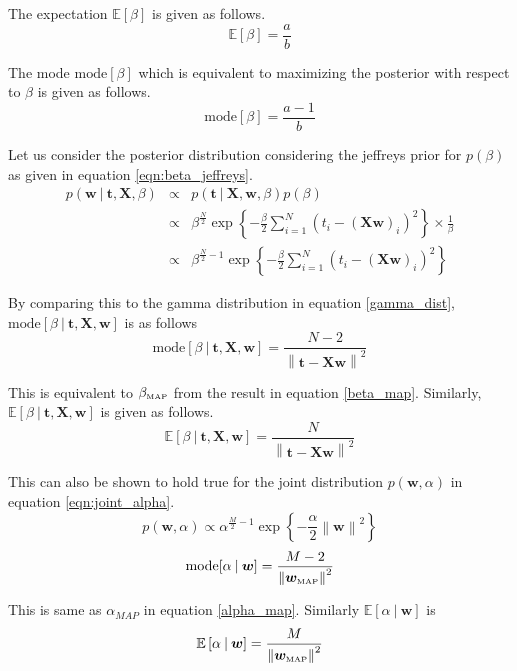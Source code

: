 \documentclass[11pt]{article}
\newcommand{\mean}[1]{\mathbb{E}\left[#1\right]}
\newcommand{\map}[1]{{#1}_{\text{\tiny MAP}}}
\newcommand\given[1][]{\:#1\vert\:}
\newcommand{\norm}[1]{\left\lVert#1\right\rVert}
\begin{document}
The expectation $\mean{\beta}$ is given as follows.
\begin{equation}
    \mean{\beta} = \frac{a}{b}
\end{equation}

The mode $\text{mode}[\beta]$ which is equivalent to maximizing the posterior with respect to $\beta$ is given as follows.
\begin{equation} \label{mode}
    \text{mode}[\beta] = \frac{a-1}{b}
\end{equation}

Let us consider the posterior distribution considering the jeffreys prior for $p(\beta)$ as given in equation \ref{eqn:beta_jeffreys}.
\begin{eqnarray}
    p(\bm{w} \given \bm{t}, \bm{X}, \beta) 
    &\propto& p(\bm{t} \given \bm{X}, \bm{w}, \beta) p(\beta) \\
    &\propto& \beta^{\frac{N}{2}}\exp\left\{-\frac{\beta}{2} \sum_{i=1}^N(t_i - (\bm{X}\bm{w})_i)^2 \right\} \times \frac{1}{\beta} \\
    &\propto& \beta^{\frac{N}{2}-1}\exp\left\{-\frac{\beta}{2} \sum_{i=1}^N(t_i - (\bm{X}\bm{w})_i)^2 \right\}
\end{eqnarray}

By comparing this to the gamma distribution in equation \ref{gamma_dist}, $\text{mode}[\beta \given \bm{t}, \bm{X}, \bm{w}]$ is as follows
\begin{equation}
    \text{mode}[\beta \given \bm{t}, \bm{X}, \bm{w}] = \frac{N-2}{\norm{\bm{t} - \bm{X}\bm{w}}^2}
\end{equation}

This is equivalent to $\map{\beta}$ from the result in equation \ref{beta_map}. Similarly, $\mean{\beta \given \bm{t}, \bm{X}, \bm{w}}$ is given as follows.
\begin{equation}
    \mean{\beta \given \bm{t}, \bm{X}, \bm{w}} = \frac{N}{\norm{\bm{t} - \bm{X}\bm{w}}^2}
\end{equation}

This can also be shown to hold true for the joint distribution $p(\bm{w}, \alpha)$ in equation \ref{eqn:joint_alpha}.
\begin{equation}
    p(\bm{w},\alpha) \propto \alpha^{\frac{M}{2}-1}\exp{\left\{ -\frac{\alpha}{2}\norm{\bm{w}}^2\right\}}
\end{equation}
\begin{equation}
    \text{mode}[\alpha \given \bm{w}] = \frac{M-2}{\norm{\map{\bm{w}}}^2}
\end{equation}

This is same as $\alpha_{MAP}$ in equation \ref{alpha_map}. Similarly $\mean{\alpha \given \bm{w}}$ is
\begin{equation}
    \mean{\alpha \given \bm{w}} = \frac{M}{\norm{\map{\bm{w}}}^2}
\end{equation}
\end{document}
